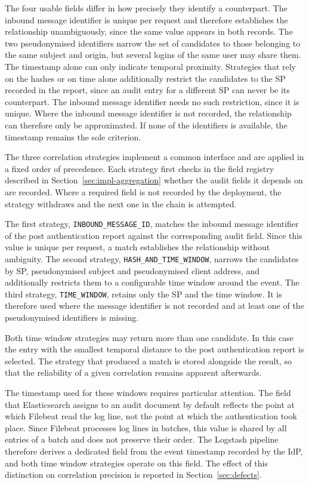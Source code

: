 \documentclass[../main.tex]{subfiles}
\begin{document}
The four usable fields differ in how precisely they identify a counterpart. 
The inbound message identifier is unique per request and therefore establishes the relationship 
unambiguously, since the same value appears in both records. 
The two pseudonymised identifiers narrow the set of candidates to those belonging to the same 
subject and origin, but several logins of the same user may share them. 
The timestamp alone can only indicate temporal proximity. 
Strategies that rely on the hashes or on time alone additionally restrict the candidates to the SP 
recorded in the report, since an audit entry for a different SP can never be its counterpart. 
The inbound message identifier needs no such restriction, since it is unique. 
Where the inbound message identifier is not recorded, the relationship can therefore only be 
approximated. 
If none of the identifiers is available, the timestamp remains the sole criterion. 

The three correlation strategies implement a common interface and are applied in a fixed order 
of precedence. 
Each strategy first checks in the field registry described in Section~\ref{sec:impl-aggregation} 
whether the audit fields it depends on are recorded. 
Where a required field is not recorded by the deployment, the strategy withdraws and the next 
one in the chain is attempted. 

The first strategy, \texttt{INBOUND\_\allowbreak{}MESSAGE\_\allowbreak{}ID}, matches the inbound 
message identifier of the post authentication report against the corresponding audit field. 
Since this value is unique per request, a match establishes the relationship without ambiguity. 
The second strategy, \texttt{HASH\_\allowbreak{}AND\_\allowbreak{}TIME\_\allowbreak{}WINDOW}, narrows 
the candidates by SP, pseudonymised subject and pseudonymised client address, and additionally restricts 
them to a configurable time window around the event. 
The third strategy, \texttt{TIME\_\allowbreak{}WINDOW}, retains only the SP and the time window. 
It is therefore used where the message identifier is not recorded and at least one of the pseudonymised 
identifiers is missing. 

Both time window strategies may return more than one candidate. 
In this case the entry with the smallest temporal distance to the post authentication report is selected. 
The strategy that produced a match is stored alongside the result, so that the reliability of a 
given correlation remains apparent afterwards. 

The timestamp used for these windows requires particular attention. 
The field that Elasticsearch assigns to an audit document by default reflects the point at which 
Filebeat read the log line, not the point at which the authentication took place. 
Since Filebeat processes log lines in batches, this value is shared by all entries of a batch and 
does not preserve their order. 
The Logstash pipeline therefore derives a dedicated field from the event timestamp recorded by the 
IdP, and both time window strategies operate on this field. 
The effect of this distinction on correlation precision is reported in Section~\ref{sec:defects}. 
\end{document}
